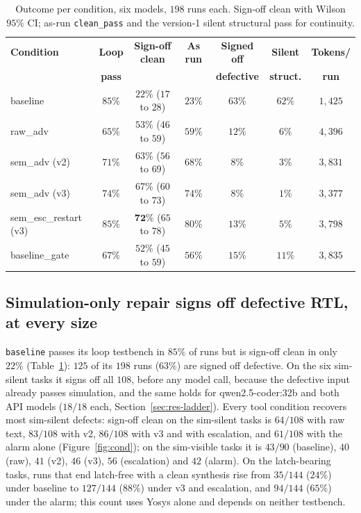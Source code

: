 \documentclass[11pt]{article}
\begin{document}
\begin{table}[htbp]
\centering
\caption{Outcome per condition, six models, $198$ runs each. Sign-off clean
with Wilson $95\%$ CI; as-run \texttt{clean\_pass} and the version-1 silent
structural pass for continuity.}
\label{tab:pooled}
\small
\begin{tabular}{@{}l c c c c c c@{}}
\toprule
\textbf{Condition} & \textbf{Loop} & \textbf{Sign-off clean} & \textbf{As run} & \textbf{Signed off} & \textbf{Silent} & \textbf{Tokens/} \\
                   & \textbf{pass} &                         &                 & \textbf{defective}  & \textbf{struct.} & \textbf{run} \\
\midrule
baseline               & $85\%$ & $22\%$ ($17$ to $28$) & $23\%$ & $63\%$ & $62\%$ & $1{,}425$ \\
raw\_adv               & $65\%$ & $53\%$ ($46$ to $59$) & $59\%$ & $12\%$ & $6\%$  & $4{,}396$ \\
sem\_adv (v2)          & $71\%$ & $63\%$ ($56$ to $69$) & $68\%$ & $8\%$  & $3\%$  & $3{,}831$ \\
sem\_adv (v3)          & $74\%$ & $67\%$ ($60$ to $73$) & $74\%$ & $8\%$  & $1\%$  & $3{,}377$ \\
sem\_esc\_restart (v3) & $85\%$ & $\mathbf{72\%}$ ($65$ to $78$) & $80\%$ & $13\%$ & $5\%$ & $3{,}798$ \\
baseline\_gate         & $67\%$ & $52\%$ ($45$ to $59$) & $56\%$ & $15\%$ & $11\%$ & $3{,}835$ \\
\bottomrule
\end{tabular}
\end{table}

\subsection{Simulation-only repair signs off defective RTL, at every size}
\label{sec:res-caught}

\texttt{baseline} passes its loop testbench in $85\%$ of runs but is sign-off
clean in only $22\%$ (Table~\ref{tab:pooled}): $125$ of its $198$ runs
($63\%$) are signed off defective. On the six sim-silent tasks it signs off all
$108$, before any model call, because the defective input already passes
simulation, and the same holds for qwen2.5-coder:32b and both API models
($18/18$ each, Section~\ref{sec:res-ladder}). Every tool condition recovers
most sim-silent defects: sign-off clean on the sim-silent tasks is $64/108$
with raw text, $83/108$ with v2, $86/108$ with v3 and with escalation, and
$61/108$ with the alarm alone (Figure~\ref{fig:cond}); on the sim-visible
tasks it is $43/90$ (baseline), $40$ (raw), $41$ (v2), $46$ (v3), $56$
(escalation) and $42$ (alarm). On the latch-bearing tasks, runs that end
latch-free with a clean synthesis rise from $35/144$ ($24\%$) under baseline to
$127/144$ ($88\%$) under v3 and escalation, and $94/144$ ($65\%$) under the
alarm; this count uses Yosys alone and depends on neither testbench.
\end{document}
